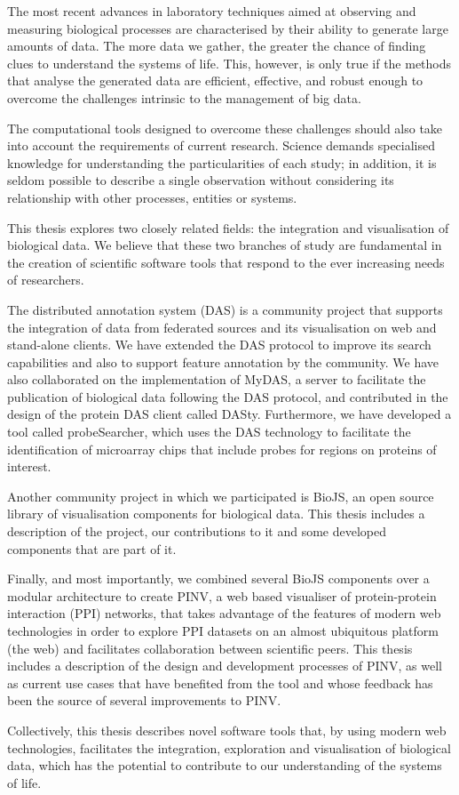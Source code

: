 
The most recent advances in laboratory techniques aimed at observing and measuring biological processes are characterised by their ability to generate large amounts of data. The more data we gather, the greater the chance of finding clues to understand the systems of life. This, however, is only true if the methods that analyse the generated data are efficient, effective, and robust enough to overcome the challenges intrinsic to the management of big data.

The computational tools designed to overcome these challenges should also take into account the requirements of current research. Science demands specialised knowledge for understanding the particularities of each study; in addition, it is seldom possible to describe a single observation without considering its relationship with other processes, entities or systems.

This thesis explores two closely related fields: the integration and visualisation of biological data. We believe that these two branches of study are fundamental in the creation of scientific software tools that respond to the ever increasing needs of researchers.

The distributed annotation system (DAS) is a community project that supports the integration of data from federated sources and its visualisation on web and stand-alone clients. We have extended the DAS protocol to improve its search capabilities and also to support feature annotation by the community. We have also collaborated on the implementation of MyDAS, a server to facilitate the publication of biological data following the DAS protocol, and contributed in the design of the protein DAS client called DASty. Furthermore, we have developed a tool called probeSearcher, which uses the DAS technology to facilitate the identification of microarray chips that include probes for regions on proteins of interest.

Another community project in which we participated is BioJS, an open source library of visualisation components for biological data. This thesis includes a description of the project, our contributions to it and some developed components that are part of it.

Finally, and most importantly, we combined several BioJS components over a modular architecture to create PINV, a web based visualiser of protein-protein interaction (PPI) networks, that takes advantage of the features of modern web technologies in order to explore PPI datasets on an almost ubiquitous platform (the web) and facilitates collaboration between scientific peers. This thesis includes a description of the design and development processes of PINV, as well as current use cases that have benefited from the tool and whose feedback has been the source of several improvements to PINV.

Collectively, this thesis describes novel software tools that, by using modern web technologies, facilitates the integration, exploration and visualisation of biological data, which has the potential to contribute to our understanding of the systems of life.
